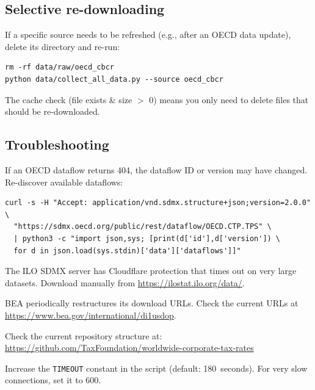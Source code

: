 \documentclass[12pt,a4paper]{article}
\begin{document}
\subsection{Selective re-downloading}

If a specific source needs to be refreshed (e.g., after an OECD data update), delete its directory and re-run:

\begin{lstlisting}[style=shellstyle]
rm -rf data/raw/oecd_cbcr
python data/collect_all_data.py --source oecd_cbcr
\end{lstlisting}

The cache check (file exists \& size $>$ 0) means you only need to delete files that should be re-downloaded.

\subsection{Troubleshooting}

\begin{description}[style=nextline]
\item[HTTP 404 errors]
If an OECD dataflow returns 404, the dataflow ID or version may have changed.
Re-discover available dataflows:
\begin{lstlisting}[style=shellstyle]
curl -s -H "Accept: application/vnd.sdmx.structure+json;version=2.0.0" \
  "https://sdmx.oecd.org/public/rest/dataflow/OECD.CTP.TPS" \
  | python3 -c "import json,sys; [print(d['id'],d['version']) \
  for d in json.load(sys.stdin)['data']['dataflows']]"
\end{lstlisting}

\item[ILO 524 timeout]
The ILO SDMX server has Cloudflare protection that times out on very large datasets.
Download manually from \url{https://ilostat.ilo.org/data/}.

\item[BEA files are HTML]
BEA periodically restructures its download URLs.
Check the current URLs at \url{https://www.bea.gov/international/di1usdop}.

\item[Tax Foundation 404]
Check the current repository structure at:\\
\url{https://github.com/TaxFoundation/worldwide-corporate-tax-rates}

\item[Connection timeouts]
Increase the \texttt{TIMEOUT} constant in the script (default: 180~seconds).
For very slow connections, set it to 600.
\end{description}
\end{document}
